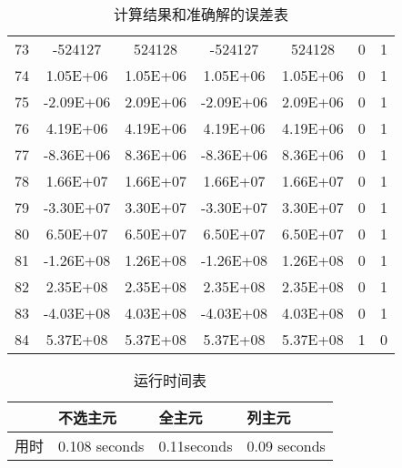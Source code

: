 \documentclass{article}
\begin{document}
\begin{table}[H]
\begin{tabular}{lcccccc}
		73        & -524127     & 524128        & -524127     & 524128        & 0           & 1             \\
		74        & 1.05E+06    & 1.05E+06      & 1.05E+06    & 1.05E+06      & 0           & 1             \\
		75        & -2.09E+06   & 2.09E+06      & -2.09E+06   & 2.09E+06      & 0           & 1             \\
		76        & 4.19E+06    & 4.19E+06      & 4.19E+06    & 4.19E+06      & 0           & 1             \\
		77        & -8.36E+06   & 8.36E+06      & -8.36E+06   & 8.36E+06      & 0           & 1             \\
		78        & 1.66E+07    & 1.66E+07      & 1.66E+07    & 1.66E+07      & 0           & 1             \\
		79        & -3.30E+07   & 3.30E+07      & -3.30E+07   & 3.30E+07      & 0           & 1             \\
		80        & 6.50E+07    & 6.50E+07      & 6.50E+07    & 6.50E+07      & 0           & 1             \\
		81        & -1.26E+08   & 1.26E+08      & -1.26E+08   & 1.26E+08      & 0           & 1             \\
		82        & 2.35E+08    & 2.35E+08      & 2.35E+08    & 2.35E+08      & 0           & 1             \\
		83        & -4.03E+08   & 4.03E+08      & -4.03E+08   & 4.03E+08      & 0           & 1             \\
		84        & 5.37E+08    & 5.37E+08      & 5.37E+08    & 5.37E+08      & 1           & 0            \\
		\bottomrule
	\end{tabular}
	\caption{计算结果和准确解的误差表}
\end{table}

\begin{table}[H]
	\centering
	\begin{tabular}{llll}
		\toprule
		& 不选主元          & 全主元         & 列主元          \\
		\midrule
		用时 & 0.108 seconds & 0.11seconds & 0.09 seconds		\\
		\bottomrule
	\end{tabular}
	\caption{运行时间表}
\end{table}
\end{document}
